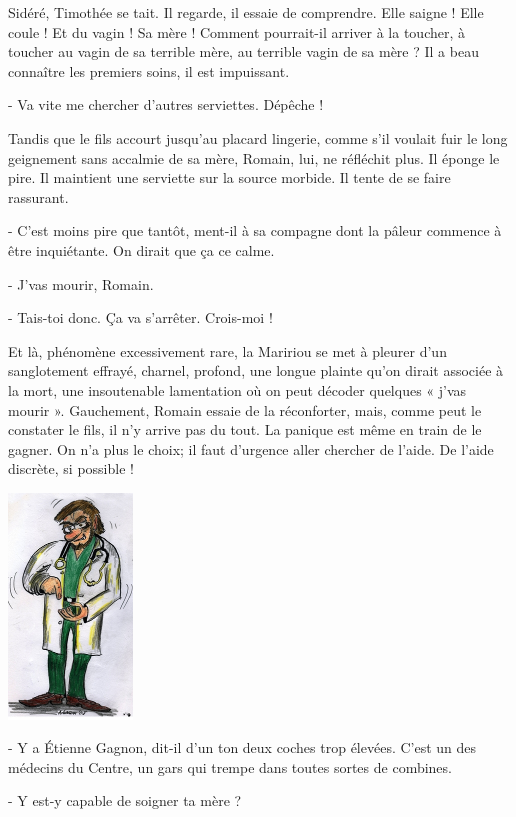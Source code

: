 Sidéré, Timothée se tait. Il regarde, il essaie de comprendre. Elle saigne ! Elle coule ! Et du vagin ! Sa mère ! Comment pourrait-il arriver à la toucher, à toucher au vagin de sa terrible mère, au terrible vagin de sa mère ? Il a beau connaître les premiers soins, il est impuissant.

- Va vite me chercher d’autres serviettes. Dépêche !

Tandis que le fils accourt jusqu’au placard lingerie, comme s’il voulait fuir le long geignement sans accalmie de sa mère, Romain, lui, ne réfléchit plus. Il éponge le pire. Il maintient une serviette sur la source morbide. Il tente de se faire rassurant.

- C’est moins pire que tantôt, ment-il à sa compagne dont la pâleur commence à être inquiétante. On dirait que ça ce calme.

- J’vas mourir, Romain.

- Tais-toi donc. Ça va s’arrêter. Crois-moi !

Et là, phénomène excessivement rare, la Maririou se met à pleurer d’un sanglotement effrayé, charnel, profond, une longue plainte qu’on dirait associée à la mort, une insoutenable lamentation où on peut décoder quelques « j’vas mourir ». Gauchement, Romain essaie de la réconforter, mais, comme peut le constater le fils, il n’y arrive pas du tout. La panique est même en train de le gagner. On n’a plus le choix; il faut d’urgence aller chercher de l’aide. De l’aide discrète, si possible !

\begin{floatingfigure}[l]{40mm}
\includegraphics[height=60mm]{corps/chapitre7/img/personnage-etienne.jpg}
\end{floatingfigure}

- Y a Étienne Gagnon, dit-il d’un ton deux coches trop élevées. C’est un des médecins du Centre, un gars qui trempe dans toutes sortes de combines.

- Y est-y capable de soigner ta mère ?


